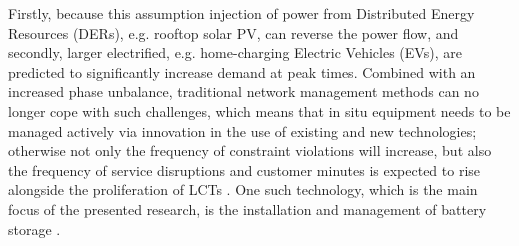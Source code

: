 Firstly, because this assumption injection of power from Distributed Energy Resources (DERs), e.g. rooftop solar PV, can reverse the power flow, and secondly, larger electrified, e.g. home-charging Electric Vehicles (EVs), are predicted to significantly increase demand at peak times.
Combined with an increased phase unbalance, traditional network management methods can no longer cope with such challenges, which means that in situ equipment needs to be managed actively via innovation in the use of existing and new technologies; otherwise not only the frequency of constraint violations  will increase, but also the frequency of service disruptions and customer minutes is expected to rise alongside the proliferation of LCTs \cite{Ault2008a}.
One such technology, which is the main focus of the presented research, is the installation and management of battery storage \cite{Chen2009}.















